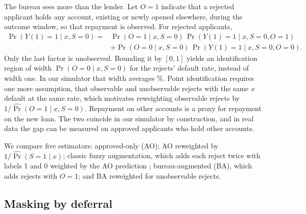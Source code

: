 \documentclass[10pt]{article}
\begin{document}
The bureau sees more than the lender. Let $O=1$ indicate that a rejected applicant holds any account, existing or newly opened elsewhere, during the outcome window, so that repayment is observed. For rejected applicants,
\begin{equation}\label{eq:obs}
\begin{split}
\Pr(Y(1)=1 \mid x, S=0) ={}& \Pr(O=1 \mid x, S=0)\,\Pr(Y(1)=1 \mid x, S=0, O=1) \\
&+ \Pr(O=0 \mid x, S=0)\,\Pr(Y(1)=1 \mid x, S=0, O=0).
\end{split}
\end{equation}
Only the last factor is unobserved. Bounding it by $[0,1]$ yields an identification region of width $\Pr(O=0\mid x, S=0)$ for the rejects' default rate, instead of width one. In our simulator that width averages \EtwoUnobserved\%. Point identification requires one more assumption, that observable and unobservable rejects with the same $x$ default at the same rate, which motivates reweighting observable rejects by $1/\hat\Pr(O=1\mid x,S=0)$. Repayment on other accounts is a proxy for repayment on the new loan. The two coincide in our simulator by construction, and in real data the gap can be measured on approved applicants who hold other accounts.

We compare five estimators: approved-only (AO); AO reweighted by $1/\hat\Pr(S=1\mid x)$; classic fuzzy augmentation, which adds each reject twice with labels 1 and 0 weighted by the AO prediction \citep{siddiqi2017}; bureau-augmented (BA), which adds rejects with $O=1$; and BA reweighted for unobservable rejects.

\subsection{Masking by deferral}\label{sec:masking}
\end{document}
